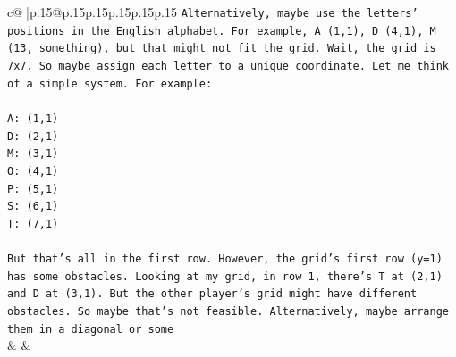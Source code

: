 \documentclass{article}
\begin{document}
{\begin{supertabular}{c@{$\;$}|p{.15\linewidth}@{}p{.15\linewidth}p{.15\linewidth}p{.15\linewidth}p{.15\linewidth}p{.15\linewidth}}
{{{\texttt{Alternatively, maybe use the letters' positions in the English alphabet. For example, A (1,1), D (4,1), M (13, something), but that might not fit the grid. Wait, the grid is 7x7. So maybe assign each letter to a unique coordinate. Let me think of a simple system. For example:} \\
\\ 
\texttt{A: (1,1)} \\
\texttt{D: (2,1)} \\
\texttt{M: (3,1)} \\
\texttt{O: (4,1)} \\
\texttt{P: (5,1)} \\
\texttt{S: (6,1)} \\
\texttt{T: (7,1)} \\
\\ 
\texttt{But that's all in the first row. However, the grid's first row (y=1) has some obstacles. Looking at my grid, in row 1, there's T at (2,1) and D at (3,1). But the other player's grid might have different obstacles. So maybe that's not feasible. Alternatively, maybe arrange them in a diagonal or some} \\
            }
        }
    }
    & & \\ \\


\end{supertabular}}
\end{document}
